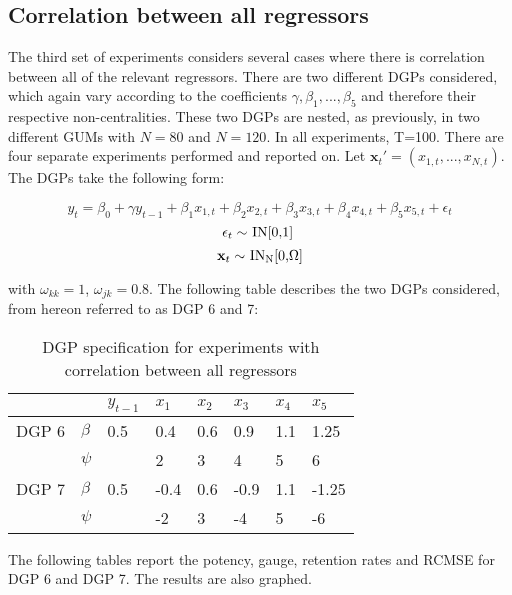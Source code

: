 \documentclass[11pt, oneside]{book}   	%
\begin{document}
\subsection{Correlation between all regressors}


The third set of experiments considers several cases where there is correlation between all of the relevant regressors. There are two different DGPs considered, which again vary according to the coefficients $\gamma,\beta_{1},...,\beta_{5}$ and therefore their respective non-centralities. These two DGPs are nested, as previously, in two different GUMs with $N=80$ and $N=120$. In all experiments, T=100. There are four separate experiments performed and reported on. Let $\textbf{x}_{t}'=(x_{1,t},...,x_{N,t})$. The DGPs take the following form: 

$$y_{t}=\beta_{0} + \gamma y_{t-1}+\beta_{1}x_{1,t}+\beta_{2}x_{2,t}+ \beta_{3}x_{3,t}+ \beta_{4}x_{4,t}+ \beta_{5}x_{5,t} + \epsilon_{t}$$
$$\centerline{$\epsilon_{t} \sim $ IN[0,1] }$$
 $$\centerline{$\textbf{x}_{t} \sim $ IN\textsubscript{N}[0,$\Omega$]}$$

with $\omega_{kk} = 1 $, $\omega_{jk} = 0.8 $. The following table describes the two DGPs considered, from hereon referred to as DGP 6 and 7:


\begin{table}[h]


\label{my-label}
\centering
\begin{tabular}{l|l|l|l|l|l|l|l}

& &$y_{t-1}$ &$x_{1}$ &$x_{2}$ &$x_{3}$ &  $x_{4}$ & $x_{5}$  \\
\hline
DGP 6 & $\beta$ & 0.5 & 0.4&0.6 &0.9&1.1  &1.25  \\

 	& $\psi$ & &2 &3 &4 &5 &6 \\
\hline
DGP 7 & $\beta$ & 0.5 & -0.4&0.6 &-0.9&1.1  &-1.25 \\

 	& $\psi$ & &-2 &3 &-4 &5 &-6 \\

    
\end{tabular}
\caption{DGP specification for experiments with correlation between all regressors}
\end{table} 


The following tables report the potency, gauge, retention rates and RCMSE for DGP 6 and DGP 7. The results are also graphed. 
\end{document}
